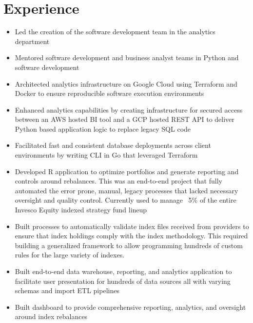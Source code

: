 \documentclass[10pt,a4paper,sans]{moderncv}
\begin{document}
\makecvtitle

\section{Experience}
\begin{itemize}
\item Led the creation of the software development team in the analytics department
\item Mentored software development and business analyst teams in Python and software development 
\item Architected analytics infrastructure on Google Cloud using Terraform and Docker to ensure reproducible software execution environments
\item Enhanced analytics capabilities by creating infrastructure for secured access between an AWS hosted BI tool and a GCP hosted REST API to deliver Python based application logic to replace legacy SQL code
\item Facilitated fast and consistent database deployments across client environments by writing CLI in Go that leveraged Terraform
\end{itemize}
\vspace{5mm}

\begin{itemize}
\item Developed R application to optimize portfolios and generate reporting and controls around rebalances. This was an end-to-end project that fully automated the error prone, manual, legacy processes that lacked necessary oversight and quality control. Currently used to manage ~5\% of the entire Invesco Equity indexed strategy fund lineup
\item Built processes to automatically validate index files received from providers to ensure that index holdings comply with the index methodology. This required building a generalized framework to allow programming hundreds of custom rules for the large variety of indexes.
\item Built end-to-end data warehouse, reporting, and analytics application to facilitate user presentation for hundreds of data sources all with varying schemas and import ETL pipelines
\item Built dashboard to provide comprehensive reporting, analytics, and oversight around index rebalances
\end{itemize}
\vspace{5mm}
\end{document}

